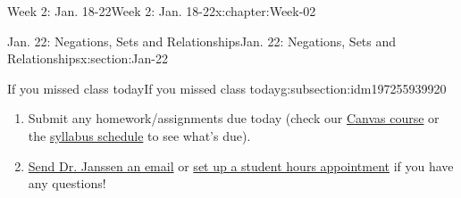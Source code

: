 \documentclass[oneside,10pt,]{book}
\numberwithin{equation}{section}
\begin{document}
\begin{chapterptx}{Week 2: Jan. 18-22}{}{Week 2: Jan. 18-22}{}{}{x:chapter:Week-02}
\begin{sectionptx}{Jan. 22: Negations, Sets and Relationships}{}{Jan. 22: Negations, Sets and Relationships}{}{}{x:section:Jan-22}
\begin{subsectionptx}{If you missed class today}{}{If you missed class today}{}{}{g:subsection:idm197255939920}
\begin{enumerate}
\item{}Submit any homework\slash{}assignments due today (check our \href{https://dordt.instructure.com/courses/3110050}{Canvas course} or the \href{https://prof.mkjanssen.org/ds/index.html\#schedule}{syllabus schedule} to see what's due).%
\item{}\href{mailto:mike.janssen@dordt.edu}{Send Dr. Janssen an email} or \href{https://calendly.com/mkjanssen/student-hours}{set up a student hours appointment} if you have any questions!%
\end{enumerate}
\end{subsectionptx}
\end{sectionptx}
\end{chapterptx}
%
%
\typeout{************************************************}
\typeout{************************************************}
%
\end{document}
